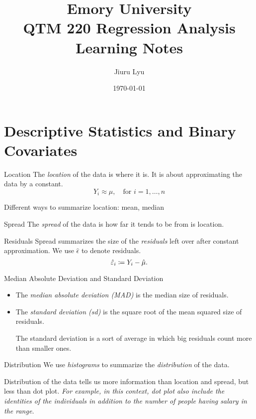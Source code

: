 

\title{Emory University\\\textbf{QTM 220 Regression Analysis}\\ Learning Notes}
\author{Jiuru Lyu}
\date{\today}


\maketitle

\tableofcontents

\newpage
\section{Descriptive Statistics and Binary Covariates}
\begin{df}{Location}
	The \textit{location} of the data is where it is. It is about approximating the data by a constant. \[Y_i\approx\mu,\quad\text{for }i=1,\dots,n\]	
\end{df}
\begin{eg}
	Different ways to summarize location: mean, median
\end{eg}
\begin{df}{Spread}
	The \textit{spread} of the data is how far it tends to be from is location. 	
\end{df}
\begin{df}{Residuals}
	Spread summarizes the size of the \textit{residuals} left over after constant approximation. We use $\hat\epsilon$ to denote residuals. \[\hat{\varepsilon}_i\coloneqq Y_i-\hat\mu.\]
\end{df}
\begin{df}{Median Absolute Deviation and Standard Deviation}
	\begin{itemize}
		\item The \textit{median absolute deviation (MAD)} is the median size of residuals.
		\item The \textit{standard deviation (sd)} is the square root of the mean squared size of residuals. 
		\begin{rmk}The standard deviation is a sort of average in which big residuals count more than smaller ones. \end{rmk}
	\end{itemize}
\end{df}
\begin{df}{Distribution}
	We use \textit{histograms} to summarize the \textit{distribution} of the data. 
\end{df}
\begin{rmk}
	Distribution of the data tells us more information than location and spread, but less than dot plot. \emph{For example, in this context, dot plot also include the identities of the individuals in addition to the number of people having salary in the range. }
\end{rmk}

